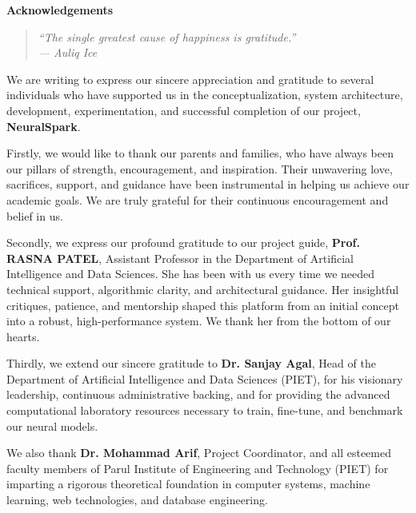 \documentclass[12pt,a4paper,oneside]{report}
\begin{document}
\newpage
\thispagestyle{plain}
\begin{center}
    {\LARGE\bfseries Acknowledgements}\\[0.6cm]
\end{center}

\begin{quote}
    \centering\itshape
    ``The single greatest cause of happiness is gratitude.''\\[0.1cm]
    \upshape--- Auliq Ice
\end{quote}

\vspace{0.5cm}
We are writing to express our sincere appreciation and gratitude to several individuals who have supported us in the conceptualization, system architecture, development, experimentation, and successful completion of our project, \textbf{NeuralSpark}.

Firstly, we would like to thank our parents and families, who have always been our pillars of strength, encouragement, and inspiration. Their unwavering love, sacrifices, support, and guidance have been instrumental in helping us achieve our academic goals. We are truly grateful for their continuous encouragement and belief in us.

Secondly, we express our profound gratitude to our project guide, \textbf{Prof. RASNA PATEL}, Assistant Professor in the Department of Artificial Intelligence and Data Sciences. She has been with us every time we needed technical support, algorithmic clarity, and architectural guidance. Her insightful critiques, patience, and mentorship shaped this platform from an initial concept into a robust, high-performance system. We thank her from the bottom of our hearts.

Thirdly, we extend our sincere gratitude to \textbf{Dr. Sanjay Agal}, Head of the Department of Artificial Intelligence and Data Sciences (PIET), for his visionary leadership, continuous administrative backing, and for providing the advanced computational laboratory resources necessary to train, fine-tune, and benchmark our neural models.

We also thank \textbf{Dr. Mohammad Arif}, Project Coordinator, and all esteemed faculty members of Parul Institute of Engineering and Technology (PIET) for imparting a rigorous theoretical foundation in computer systems, machine learning, web technologies, and database engineering.
\end{document}
